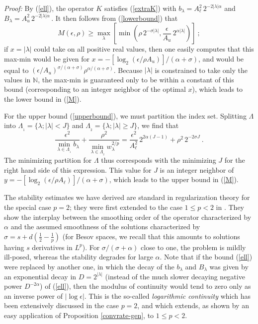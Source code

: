 \documentclass[10pt]{article}
\newcommand{\QED}{\hfill \raisebox{-2pt}{\rule{5.6pt}{8pt}\rule{4pt}{0pt}}%
  \smallskip\par}
\def\N{\mathbb{N}}
\newcommand\eref[1]{(\ref{#1})}
\begin{document}
{\em Proof:}
By \eref{ell}, the operator $K$ satisfies
\eref{extraK} with $b_\lambda=A_{\ell}^2\, 2^{-2\vert\lambda\vert\alpha}$
and $B_\lambda=A_u^2\, 2^{-2\vert\lambda\vert\alpha} \,$.
\newline
It then follows from \eref{lowerbound} that
$$
M(\epsilon, \rho) \geq \max_\lambda \left[ \min \left(
\rho \, 2^{- \sigma |\lambda|} , \frac{\epsilon}{A_u}\, 2^{\alpha |\lambda|}
\right) \right] ~;
$$
if $x=|\lambda|$ could take on all positive real values, then one easily
computes
that this max-min would be given for
$x= - [\log_2(\epsilon/\rho A_u)]/(\alpha + \sigma)$, and would be equal to
$(\epsilon/A_u)^{\sigma/(\alpha + \sigma)} \rho^{\alpha/(\alpha + \sigma)}$.
Because $|\lambda|$ is constrained to take only the values in $\N$, the max-min
is guaranteed only to be within a constant of this bound (corresponding
to an integer neighbor of the optimal $x$), which leads
to the lower bound in \eref{M}.

For the upper bound \eref{upperbound}, we must partition the index set.
Splitting $\Lambda$ into $\Lambda_{_1}=\{\lambda; |\lambda| < J\}$ and
$\Lambda_{_2}=\{\lambda; |\lambda| \ge J\}$, we find that
$$
\frac{\epsilon^2}{\min_{\lambda \in \Lambda_{_{1}}}b_\lambda} +
\frac{\rho^2}{\min_{\lambda \in \Lambda_{_{2}}}w_\lambda^{2/p}}
=\frac{\epsilon^2}{A_\ell^2}\, 2^{2\alpha(J-1)} +  \rho^2\, 2^{-2 \sigma J} ~.
$$
The minimizing partition for $\Lambda$ thus corresponds with the minimizing
$J$ for the right hand side of this expression. This value
for  $J$ is an integer neighbor of
$y= - [\log_2(\epsilon/\rho A_\ell)]/(\alpha + \sigma)$, which leads to the
upper bound in \eref{M}.
\hfill \QED

\bigskip

The stability estimates we have derived are standard in regularization
theory for the special case $p=2$; they were first extended
to the case $1\leq p < 2$
in \cite{DeM02}. They show the interplay between the smoothing order of the
operator
characterized by $\alpha$ and the assumed smoothness of
the solutions characterized by $\sigma=s+d(\frac{1}{2}-\frac{1}{p})$
(for Besov spaces, we recall that this amounts to
solutions
having $s$ derivatives in $L^p$). For
$\sigma/(\sigma+\alpha)$ close to one, the problem is mildly ill-posed,
whereas the stability degrades for large $\alpha$. Note that if
the bound (\ref{ell}) were replaced by another one,
in which the decay of the $b_\lambda$ and
$B_\lambda$ was given by an exponential decay in $D=2^{|\lambda|}$ (instead
of the much slower decaying negative power $D^{-2\alpha}$) of \eref{ell},
then the modulus of continuity would tend to zero only as an
inverse power
of $| \log\epsilon|$. This is the so-called {\it logarithmic continuity}
which has been extensively discussed in the case $p=2$, and which extends,
as shown
by an easy application of Proposition \ref{convrate-gen}, to $1 \le p <2$.
\end{document}

